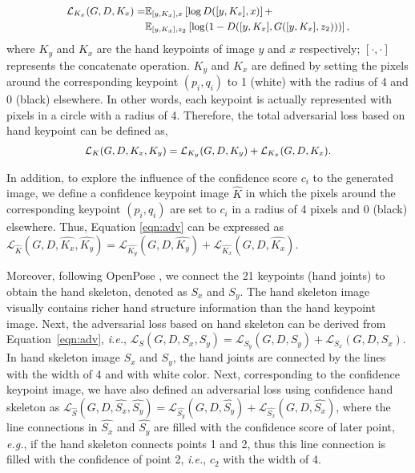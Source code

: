 \documentclass[sigconf]{acmart}
\begin{document}
\begin{equation}\small
\begin{aligned}
\mathcal{L}_{K_x}(G, D, K_x) =  & \mathbb{E}_{[y, K_x], x} \left[\log D([y, K_x], x) \right] +  \\
& \mathbb{E}_{[y,K_x], z_2} \left[\log (1 - D([y, K_x], G([y, K_x], z_2))) \right],
\end{aligned}
\label{eqn:keypointgan2}
\end{equation}
where $K_y$ and $K_x$ are the hand keypoints of image $y$ and $x$ respectively; 
$[\cdot,\cdot]$ represents the concatenate operation. $K_y$ and $K_x$ are defined by setting the pixels around the corresponding keypoint $(p_i, q_i)$ to 1 (white) with the radius of 4 and 0 (black) elsewhere.
In other words, each keypoint is actually represented with pixels in a circle with a radius of 4. 
Therefore, the total adversarial loss based on hand keypoint can be defined as,
\begin{equation}\small
\begin{aligned}
\mathcal{L}_K(G, D, K_x, K_y) = \mathcal{L}_{K_y}(G, D, K_y) + \mathcal{L}_{K_x}(G, D, K_x).
\end{aligned}
\label{eqn:adv}
\end{equation}

In addition, to explore the influence of the confidence score $c_i$ to the generated image, we define a confidence keypoint image $\widehat{K}$ in which the pixels around the corresponding keypoint $(p_i, q_i)$ are set to $c_i$ in a radius of 4 pixels and 0 (black) elsewhere.
Thus, Equation \ref{eqn:adv} can be expressed as $\mathcal{L}_{\widehat{K}}(G, D, \widehat{K_x}, \widehat{K_y}) = \mathcal{L}_{\widehat{K_y}}(G, D, \widehat{K_y}) + \mathcal{L}_{\widehat{K_x}}(G, D, \widehat{K_x})$.

Moreover, following OpenPose \cite{simon2017hand}, we connect the 21 keypoints (hand joints) to obtain the hand skeleton, denoted as $S_x$ and $S_y$.
The hand skeleton image visually contains richer hand structure information than the hand keypoint image.
Next, the adversarial loss based on hand skeleton can be derived from Equation~\ref{eqn:adv}, \textit{i.e.}, $\mathcal{L}_S(G, D, S_x, S_y) = \mathcal{L}_{S_y}(G, D, S_y) + \mathcal{L}_{S_x}(G, D, S_x) $.
In hand skeleton image $S_x$ and $S_y$, the hand joints are connected by the lines with the width of 4 and with white color.
Next, corresponding to the confidence keypoint image, we have also defined an adversarial loss using confidence hand skeleton as $\mathcal{L}_{\widehat{S}}(G, D, \widehat{S_x}, \widehat{S_y}) = \mathcal{L}_{\widehat{S_y}}(G, D, \widehat{S_y}) + \mathcal{L}_{\widehat{S_x}}(G, D, \widehat{S_x}) $,
where the line connections in $\widehat{S_x}$ and $\widehat{S_y}$ are filled with the confidence score of later point, \textit{e.g.}, if the hand skeleton connects points 1 and 2, thus this line connection is filled with the confidence of point 2, \textit{i.e.}, $c_2$ with the width of 4.
\end{document}
